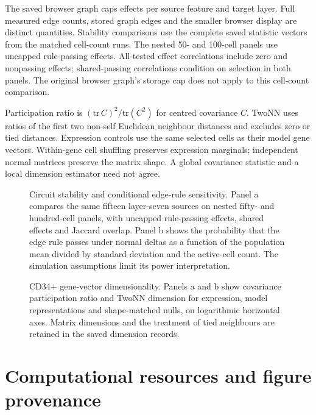\documentclass[11pt]{article}
\begin{document}
The saved browser graph caps effects per source feature and target layer. Full measured edge
counts, stored graph edges and the smaller browser display are distinct quantities. Stability
comparisons use the complete saved statistic vectors from the matched cell-count runs.
The nested 50- and 100-cell panels use uncapped rule-passing effects. All-tested effect
correlations include zero and nonpassing effects; shared-passing correlations condition on
selection in both panels. The original browser graph's storage cap does not apply to this
cell-count comparison.



Participation ratio is $(\mathrm{tr}\,C)^2/\mathrm{tr}(C^2)$ for centred covariance $C$.
TwoNN uses ratios of the first two non-self Euclidean neighbour distances and excludes zero
or tied distances. Expression controls use the same selected cells as their model gene vectors.
Within-gene cell shuffling preserves expression marginals; independent normal matrices preserve
the matrix shape. A global covariance statistic and a local dimension estimator need not agree.



\begin{figure}[p]
\centering
\caption{Circuit stability and conditional edge-rule sensitivity. Panel a compares the same fifteen
layer-seven sources on nested fifty- and hundred-cell panels, with uncapped rule-passing effects,
shared effects and Jaccard overlap. Panel b shows the probability
that the edge rule passes under normal deltas as a function of the population mean divided by
standard deviation and the active-cell count. The simulation assumptions limit its power interpretation.}
\label{fig:circuitsensitivity}
\end{figure}
\clearpage

\begin{figure}[p]
\centering
\caption{CD34+ gene-vector dimensionality. Panels a and b show covariance participation ratio and
TwoNN dimension for expression, model representations and shape-matched nulls, on logarithmic
horizontal axes. Matrix dimensions
and the treatment of tied neighbours are retained in the saved dimension records.}
\label{fig:dimensions}
\end{figure}
\clearpage

\section{Computational resources and figure provenance}
\end{document}
